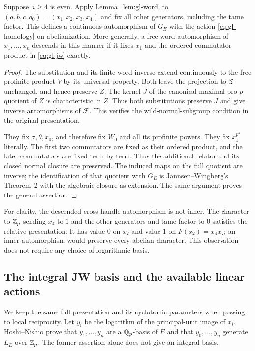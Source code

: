 \begin{proposition}
\label{prop:gl-full-descent}
Suppose $n\ge4$ is even. Apply Lemma~\ref{lem:gl-word} to
$(a,b,c,d_0)=(x_1,x_2,x_3,x_4)$ and fix all other generators,
including the tame factor. This defines a continuous automorphism
of $G_E$ with the action \eqref{eq:gl-homology} on abelianization.
More generally, a free-word automorphism of $x_1,\ldots,x_n$
descends in this manner if it fixes $x_1$ and the ordered
commutator product in \eqref{eq:gl-jw} exactly.
\end{proposition}
\begin{proof}
The substitution and its finite-word inverse extend continuously to
the free profinite product $V$ by its universal property. Both leave
the projection to $\mathfrak T$ unchanged, and hence preserve $Z$.
The kernel $J$ of the canonical maximal pro-$p$ quotient of $Z$
is characteristic in $Z$. Thus both substitutions preserve $J$ and
give inverse automorphisms of $\mathcal F$. This verifies the
wild-normal-subgroup condition in the original presentation.

They fix $\sigma,\theta,x_0$, and therefore fix $W_0$ and all its
profinite powers. They fix $x_1^{p^s}$ literally. The first two
commutators are fixed as their ordered product, and the later
commutators are fixed term by term. Thus the additional relator
and its closed normal closure are preserved. The induced maps on
the full quotient are inverse; the identification of that quotient
with $G_E$ is Jannsen--Wingberg's Theorem~2 with the algebraic closure
as extension. The same argument proves the general assertion.
\end{proof}

For clarity, the descended cross-handle automorphism is not inner.
The character to $\mathbb Z_p$ sending $x_4$ to $1$ and the other generators
and tame factor to $0$ satisfies the relative presentation. It has
value $0$ on $x_2$ and value $1$ on $F(x_2)=x_4x_2$; an inner
automorphism would preserve every abelian character. This observation
does not require any choice of logarithmic basis.

\subsection{The integral JW basis and the available linear actions}

We keep the same full presentation and its cyclotomic parameters when
passing to local reciprocity. Let $y_i$ be the logarithm of the
principal-unit image of $x_i$. Hoshi--Nishio
\cite[Lemma~1.3 and its proof]{HoshiNishio} prove that
$y_1,\ldots,y_n$ are a $\mathbb Q_p$-basis of $E$ and that
$y_0,\ldots,y_n$ generate $L_E$ over $\mathbb Z_p$. The former assertion
alone does not give an integral basis.

